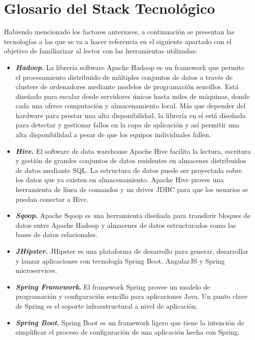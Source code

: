 \section{Glosario del Stack Tecnológico}
Habiendo mencionado los factores anteriores, a continuación se presentan las tecnologías a las que se va a hacer referencia en el siguiente apartado con el objetivo de familiarizar al lector con las herramientas utilizadas:
\begin{itemize}
\item \textbf{\textit{Hadoop}.} \cite{hadoop} La librería software Apache Hadoop es un framework que permite el procesamiento distribuido de múltiples conjuntos de datos a través de clusters de ordenadores mediante modelos de programación sencillos. Está diseñado para escalar desde servidores únicos hasta miles de máquinas, donde cada una ofrece computación y almacenamiento local. Más que depender del hardware para prestar una alta disponibilidad, la librería en sí está diseñada para detectar y gestionar fallos en la capa de aplicación y así permitir una alta disponibilidad a pesar de que los equipos individuales fallen. 
\item \textbf{\textit{Hive}.} \cite{hive}  El software de data warehouse Apache Hive facilita la lectura, escritura y gestión de grandes conjuntos de datos residentes en almacenes distribuidos de datos mediante SQL. La estructura de datos puede ser proyectada sobre los datos que ya existen en almacenamiento. Apache Hive provee una herramienta de línea de comandos y un driver JDBC para que los usuarios se puedan conectar a Hive. 
\item \textbf{\textit{Sqoop}.} \cite{sqoop} Apache Sqoop es una herramienta diseñada para transferir bloques de datos entre Apache Hadoop y almacenes de datos estructurados como las bases de datos relacionales.
\item \textbf{\textit{JHipster}.} \cite{jhipster} JHipster es una plataforma de desarrollo para generar, desarrollar y lanzar aplicaciones con tecnología Spring Boot, AngularJS y Spring microservices. 
\item \textbf{\textit{Spring Framework}.} \cite{springframework} El framework Spring provee un modelo de programación y configuración sencillo para aplicaciones Java. Un punto clave de Spring es el soporte infraestructural a nivel de aplicación. 
\item \textbf{\textit{Spring Boot}.} \cite{springboot} Spring Boot es un framework ligero que tiene la intención de simplificar el proceso de configuración de una aplicación hecha con Spring. 

\end{itemize}
